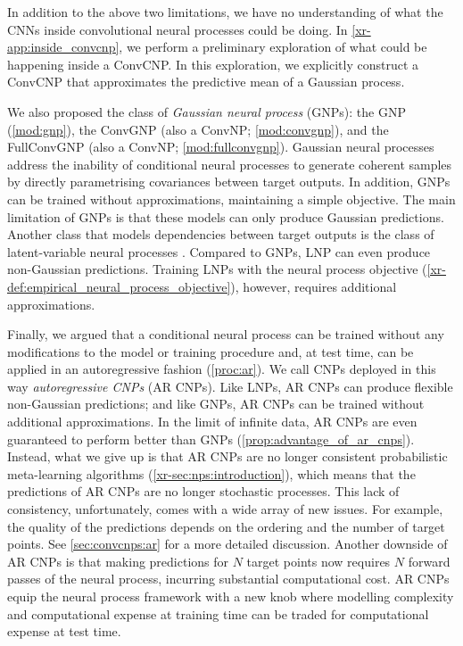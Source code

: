 \documentclass[12pt]{report}
\newcommand{\xrprefix}[1]{xr-#1}
\begin{document}
In addition to the above two limitations, 
we have no understanding of what the CNNs inside convolutional neural processes could be doing.
In \cref{\xrprefix{app:inside_convcnp}}, we perform a preliminary exploration of what could be happening inside a ConvCNP.
In this exploration, we explicitly construct a ConvCNP that approximates the predictive mean of a Gaussian process. %

We also proposed the class of \emph{Gaussian neural process} (GNPs): the GNP (\cref{mod:gnp}), the ConvGNP (also a ConvNP; \cref{mod:convgnp}), and the FullConvGNP (also a ConvNP; \cref{mod:fullconvgnp}).
Gaussian neural processes address the inability of conditional neural processes to generate coherent samples
by directly parametrising covariances between target outputs.
In addition, GNPs can be trained without approximations, maintaining a simple objective.
The main limitation of GNPs is that these models can only produce Gaussian predictions.
Another class that models dependencies between target outputs is the class of latent-variable neural processes \parencite[LNPs;][]{Garnelo:2018:Neural_Processes}.
Compared to GNPs, LNP can even produce non-Gaussian predictions.
Training LNPs with the neural process objective (\cref{\xrprefix{def:empirical_neural_process_objective}}), however, requires additional approximations.

Finally, we argued that a conditional neural process can be trained without any modifications to the model or training procedure and, at test time, can be applied in an autoregressive fashion (\cref{proc:ar}).
We call CNPs deployed in this way \emph{autoregressive CNPs} (AR CNPs).
Like LNPs, AR CNPs can produce flexible non-Gaussian predictions;
and like GNPs, AR CNPs can be trained without additional approximations.
In the limit of infinite data, AR CNPs are even guaranteed to perform better than GNPs (\cref{prop:advantage_of_ar_cnps}).
Instead, what we give up is that AR CNPs are no longer consistent probabilistic meta-learning algorithms (\cref{\xrprefix{sec:nps:introduction}}), which means that the predictions of AR CNPs are no longer stochastic processes.
This lack of consistency, unfortunately, comes with a wide array of new issues.
For example, the quality of the predictions depends on the ordering and the number of target points.
See \cref{sec:convcnps:ar} for a more detailed discussion.
Another downside of AR CNPs is that making predictions for $N$ target points now requires $N$ forward passes of the neural process, incurring substantial computational cost.
AR CNPs equip the neural process framework with a new knob where modelling complexity and computational expense at training time can be traded for computational expense at test time.
\end{document}
